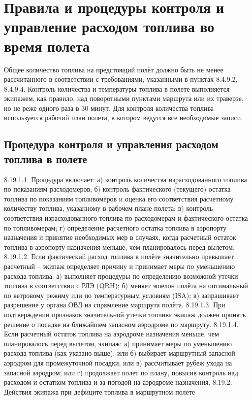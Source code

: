 \section{Правила и процедуры контроля и управление расходом топлива во время полета}

Общее количество топлива на предстоящий полёт должно быть не менее рассчитанного в соответствии с требованиями, указанными в пунктах 8.4.9.2, 8.4.9.4.
Контроль количества и температуры топлива в полете выполняется экипажем, как правило, над поворотными пунктами маршрута или их траверзе, но не реже одного раза в 30 минут. Для контроля количества топлива используется рабочий план полета, в котором ведутся все необходимые записи.

\subsection{Процедура контроля и управления расходом топлива в полете}
8.19.1.1. Процедура включает:
а)	контроль количества израсходованного топлива по показаниям расходомеров;
б)	контроль фактического (текущего) остатка топлива по показаниям топливомеров и оценка его соответствия расчетному количеству топлива, указанному в рабочем плане полета;
в)	контроль соответствия израсходованного топлива по расходомерам и фактического остатка по топливомерам;
г)	определение расчетного остатка топлива в аэропорту назначения и принятие необходимых мер в случаях, когда расчетный остаток топлива в аэропорту назначения меньше, чем планировалось перед вылетом.
8.19.1.2. Если фактический расход топлива в полёте значительно превышает расчетный – экипаж определяет причину и принимает меры по уменьшению расхода топлива:
а)	выполняет процедуры по определению возможной утечки топлива в соответствии с РЛЭ (QRH);
б)	меняет эшелон полёта на оптимальный по ветровому режиму или по температурным условиям (ISA);
в)	запрашивает разрешение у органа ОВД на спрямление маршрута полёта.
8.19.1.3. При подтверждении признаков значительной утечки топлива экипаж должен принять решение о посадке на ближайшем запасном аэродроме по маршруту.
8.19.1.4. Если расчетный остаток топлива на аэродроме назначения меньше, чем планировалось перед вылетом, экипаж:
а)	принимает меры по уменьшению расхода топлива (как указано выше); или
б)	выбирает маршрутный запасной аэродром для промежуточной посадки; или
в)	рассчитывает рубеж ухода на запасной аэродром; или
г)	продолжает полет по плану, повысив контроль над расходом и остатком топлива и за погодой на аэродроме назначения.
8.19.2.	Действия экипажа при дефиците топлива в маршрутном полёте

